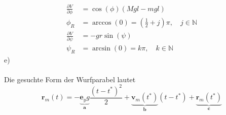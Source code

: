 \begin{align*}
	\frac{\partial V}{\partial \phi} &= \cos(\phi)(Mgl - mgl) \\
	\phi_R &= \arccos(0) = \left(\frac{1}{2} + j\right)\pi, \quad j\in\mathbb{N} \\
	\frac{\partial V}{\partial \psi} &= -gr\sin(\psi) \\
	\psi_R &= \arcsin(0) = k\pi, \quad k\in\mathbb{N}
\end{align*}
e)\\ \\
Die gesuchte Form der Wurfparabel lautet
\[
	\textbf{r}_m(t) = -\underbrace{\textbf{e}_yg}_{\textbf{a}}\frac{(t - t^*)^2}{2} + \underbrace{\textbf{v}_m(t^*)}_{\textbf{b}}(t - t^*) + \underbrace{\textbf{r}_m(t^*)}_{\textbf{c}}
\]